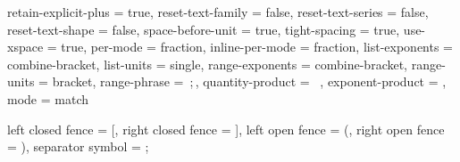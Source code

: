 \RequirePackage[locale = PL]{siunitx}

\RequirePackage{lualatex-math}
\RequirePackage{unicode-math}
\RequirePackage{interval}
\RequirePackage{fontspec}
\RequirePackage{lmodern}
\RequirePackage{gensymb}

\sisetup
{
	retain-explicit-plus = true,
	reset-text-family    = false,
	reset-text-series    = false,
	reset-text-shape     = false,
	space-before-unit    = true,
	tight-spacing        = true,
	use-xspace           = true,
	per-mode             = fraction,
	inline-per-mode      = fraction,
	list-exponents       = combine-bracket,
	list-units           = single,
	range-exponents      = combine-bracket,
	range-units          = bracket,
	range-phrase         = \,;\,,
	quantity-product     = ~,
	exponent-product     = \cdot,
	mode                 = match
}

\intervalconfig
{
	left closed fence    = [,
	right closed fence   = ],
	left open fence      = (,
	right open fence     = ),
	separator symbol     = ;
}

\renewcommand{\arraystretch}{1.30}
